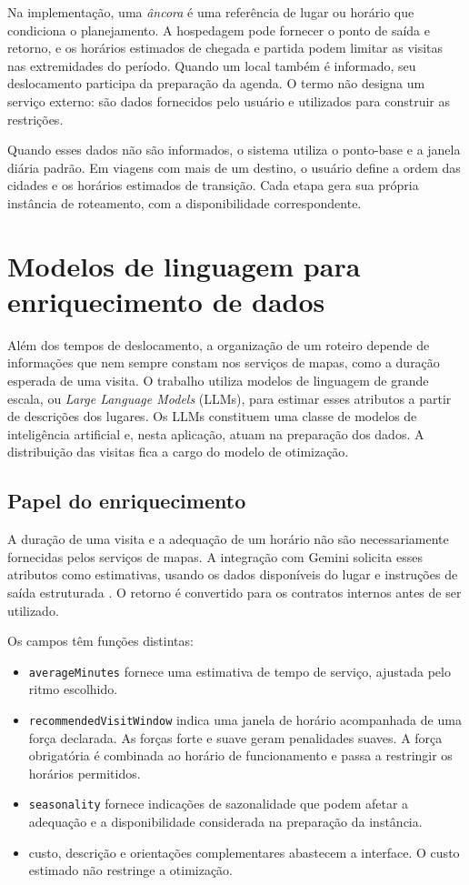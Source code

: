 Na implementação, uma \textit{âncora} é uma referência de lugar ou horário que condiciona o planejamento. A hospedagem pode fornecer o ponto de saída e retorno, e os horários estimados de chegada e partida podem limitar as visitas nas extremidades do período. Quando um local também é informado, seu deslocamento participa da preparação da agenda. O termo não designa um serviço externo: são dados fornecidos pelo usuário e utilizados para construir as restrições.

Quando esses dados não são informados, o sistema utiliza o ponto-base e a janela diária padrão. Em viagens com mais de um destino, o usuário define a ordem das cidades e os horários estimados de transição. Cada etapa gera sua própria instância de roteamento, com a disponibilidade correspondente.

\section{Modelos de linguagem para enriquecimento de dados}

Além dos tempos de deslocamento, a organização de um roteiro depende de informações que nem sempre constam nos serviços de mapas, como a duração esperada de uma visita. O trabalho utiliza modelos de linguagem de grande escala, ou \textit{Large Language Models} (LLMs), para estimar esses atributos a partir de descrições dos lugares. Os LLMs constituem uma classe de modelos de inteligência artificial e, nesta aplicação, atuam na preparação dos dados. A distribuição das visitas fica a cargo do modelo de otimização.

\subsection{Papel do enriquecimento}

A duração de uma visita e a adequação de um horário não são necessariamente fornecidas pelos serviços de mapas. A integração com Gemini solicita esses atributos como estimativas, usando os dados disponíveis do lugar e instruções de saída estruturada \cite{google_gemini_api}. O retorno é convertido para os contratos internos antes de ser utilizado.

Os campos têm funções distintas:
\begin{itemize}
  \item \texttt{averageMinutes} fornece uma estimativa de tempo de serviço, ajustada pelo ritmo escolhido.
  \item \texttt{recommendedVisitWindow} indica uma janela de horário acompanhada de uma força declarada. As forças forte e suave geram penalidades suaves. A força obrigatória é combinada ao horário de funcionamento e passa a restringir os horários permitidos.
  \item \texttt{seasonality} fornece indicações de sazonalidade que podem afetar a adequação e a disponibilidade considerada na preparação da instância.
  \item custo, descrição e orientações complementares abastecem a interface. O custo estimado não restringe a otimização.
\end{itemize}

